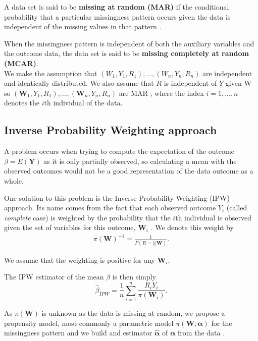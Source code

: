 \documentclass[12pt,twoside]{article}
\begin{document}
A data set is said to be \textbf{missing at random (MAR)} if the conditional probability that a particular missingness pattern occurs given the data is independent of the missing values in that pattern \cite{vansteelandt}.

When the missingness pattern is independent of both the auxiliary variables and the outcome data, the data set is said to be \textbf{missing completely at random (MCAR)}.\\

We make the assumption that $(W_1, Y_1, R_1),...,(W_n, Y_n, R_n)$ are independent and identically distributed. We also assume that $R$ is independent of $Y$ given W so $(\mathbf{W}_1, Y_1, R_1), ... ,(\mathbf{W}_n, Y_n, R_n)$ are MAR \cite{vansteelandt}, where the index $i = 1,...,n$ denotes the $i$th individual of the data.\\

\subsection{Inverse Probability Weighting approach}

A problem occurs when trying to compute the expectation of the outcome $\beta = E(\mathbf{Y})$ as it is only partially observed, so calculating a mean with the observed outcomes would not be a good representation of the data outcome as a whole.

One solution to this problem is the Inverse Probability Weighting (IPW) approach. Its name comes from the fact that each observed outcome $Y_i$ (called \textit{complete} case) is weighted by the probability that the $i$th individual is observed given the set of variables for this outcome, $\mathbf{W}_i$ \cite{vansteelandt}. We denote this weight by
\begin{align*}
    \pi(\mathbf{W})^{-1} = \frac{1}{P(R = 1|\mathbf{W})}.
\end{align*}

We assume that the weighting is positive for any $\mathbf{W}_i$.

The IPW estimator of the mean $\beta$ is then simply 
\begin{equation} \label{IPW_est}
    \hat{\beta}_{IPW} = \frac{1}{n} \sum_{i=1}^{n} \frac{R_iY_i}{\pi(\mathbf{W}_i)}.
\end{equation}

As $\pi(\mathbf{W})$ is unknown as the data is missing at random, we propose a propensity model, most commonly a parametric model $\pi(\mathbf{W}; \boldsymbol\alpha)$ for the missingness pattern and we build and estimator $\hat{\boldsymbol\alpha}$ of $\boldsymbol\alpha$ from the data \cite{vansteelandt}.
\end{document}
